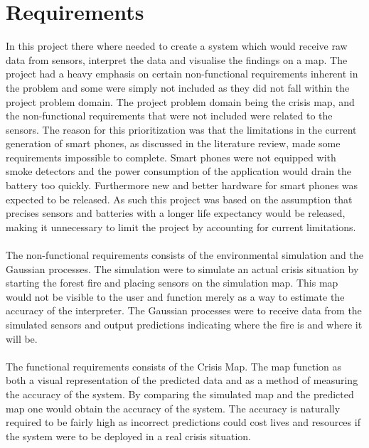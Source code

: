 \section{Requirements}
In this project there where needed to create a system which would receive raw data from sensors, interpret the data and visualise the findings on a map. The project had a heavy emphasis on certain non-functional requirements inherent in the problem and some were simply not included as they did not fall within the project problem domain. The project problem domain being the crisis map, and the non-functional requirements that were not included were related to the sensors. The reason for this prioritization was that the limitations in the current generation of smart phones, as discussed in the literature review, made some requirements impossible to complete. Smart phones were not equipped with smoke detectors and the power consumption of the application would drain the battery too quickly. Furthermore new and better hardware for smart phones was expected to be released. As such this project was based on the assumption that precises sensors and batteries with a longer life expectancy would be released, making it unnecessary to limit the project by accounting for current limitations.
\\\\
The non-functional requirements consists of the environmental simulation and the Gaussian processes. The simulation were to simulate an actual crisis situation by starting the forest fire and placing sensors on the simulation map. This map would not be visible to the user and function merely as a way to estimate the accuracy of the interpreter. The Gaussian processes were to receive data from the simulated sensors and output predictions indicating where the fire is and where it will be.
\\\\
The functional requirements consists of the Crisis Map. The map function as both a visual representation of the predicted data and as a method of measuring the accuracy of the system. By comparing the simulated map and the predicted map one would obtain the accuracy of the system. The accuracy is naturally required to be fairly high as incorrect predictions could cost lives and resources if the system were to be deployed in a real crisis situation.